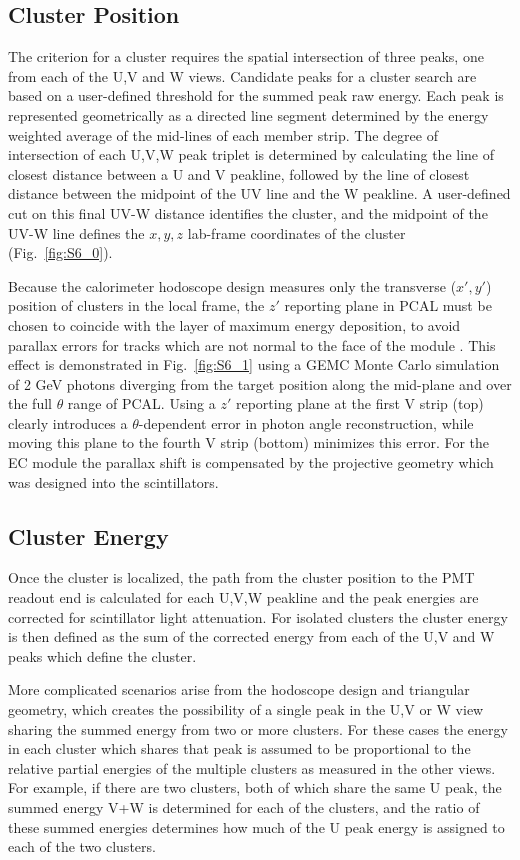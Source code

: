 \subsection {Cluster Position}
The criterion for a cluster requires the spatial intersection of three peaks, one from each of the U,V and W views.  Candidate peaks for a cluster search are based on a user-defined threshold for the summed peak raw energy.  Each peak is represented geometrically as a directed line segment determined by the energy weighted average of the mid-lines of each member strip.   The degree of intersection of each U,V,W peak triplet is determined by calculating the line of closest distance between a U and V peakline, followed by the line of closest distance between the midpoint of the UV line and the W peakline.  A user-defined cut on this final UV-W distance identifies the cluster, and the midpoint of the UV-W line defines the $x,y,z$ lab-frame coordinates of the cluster (Fig.~\ref{fig:S6_0}).  

Because the calorimeter hodoscope design measures only the transverse ($x',y'$) position of clusters in the local frame, the $z'$ reporting plane in PCAL must be chosen to coincide with the layer of maximum energy deposition, to avoid parallax errors for tracks which are not normal to the face of the module \cite{nima2018}.  This effect is demonstrated in Fig.~\ref{fig:S6_1} using a GEMC Monte Carlo simulation of 2 GeV photons diverging from the target position along the mid-plane and over the full $\theta$ range of PCAL.  Using a $z'$ reporting plane at the first V strip (top) clearly introduces a $
\theta$-dependent error in photon angle reconstruction, while moving this plane to the fourth V strip (bottom) minimizes this error.  For the EC module the parallax shift is compensated by the projective geometry which was designed into the scintillators.   

\subsection {Cluster Energy}

Once the cluster is localized, the path from the cluster position to the PMT readout end is calculated for each U,V,W peakline and the peak energies are corrected for scintillator light attenuation.  For isolated clusters the cluster energy is then defined as the sum of the corrected energy from each of the U,V and W peaks which define the cluster.  

More complicated scenarios arise from the hodoscope design and triangular geometry, which creates the possibility of a single peak in the U,V or W view sharing the summed energy from two or more clusters.  For these cases the energy in each cluster which shares that peak is assumed to be proportional to the relative partial energies of the multiple clusters as measured in the other views.  For example, if there are two clusters, both of which share the same U peak, the summed energy V+W is determined for each of the clusters, and the ratio of these summed energies determines how much of the U peak energy is  assigned to each of the two clusters.  

